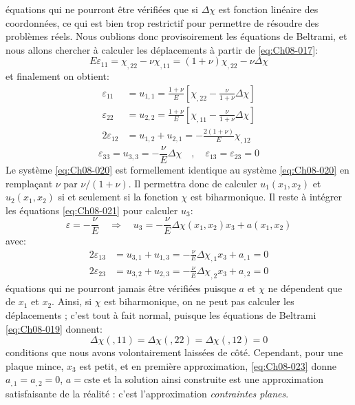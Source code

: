 équations qui ne pourront être vérifiées que si $\Delta\chi$ est fonction linéaire des coordonnées, ce qui est bien trop restrictif pour permettre de résoudre des problèmes réels.
Nous oublions donc provisoirement les équations de Beltrami, et nous allons chercher à calculer les déplacements à partir de \eqref{eq:Ch08-017}: 
\begin{equation*}
  E\varepsilon_{11}=\chi_{,22}-\nu\chi_{,11}=(1+\nu)\chi_{,22}-\nu\Delta\chi
\end{equation*}
et finalement on obtient: 
\begin{equation}
    \begin{aligned}
        \varepsilon_{11}   &  = u_{1,1} = \frac{1+\nu}{E} \left[\chi_{,22}-\frac{\nu}{1+\nu}\Delta\chi\right]\\
        \varepsilon_{22}   &  = u_{2,2} =   \frac{1+\nu}{E} \left[\chi_{,11}-\frac{\nu}{1+\nu}\Delta\chi\right]\\
        2\varepsilon_{12}  &  = u_{1,2} + u_{2,1} =  -\frac{2(1+\nu)}{E} \chi_{,12}
    \end{aligned}
    \label{eq:Ch08-020}
\end{equation}
\begin{equation}
    \varepsilon_{33} = u_{3,3} = -\frac{\nu}{E}\Delta \chi \quad,\quad \varepsilon_{13} = \varepsilon_{23} = 0
    \label{eq:Ch08-021}
\end{equation}
Le système \eqref{eq:Ch08-020} est formellement identique au système \eqref{eq:Ch08-020} en remplaçant $\nu$ par $\nu/(1+\nu)$.
Il permettra donc de calculer $u_1(x_1,x_2)$ et $u_2(x_1,x_2)$ si et seulement si la fonction $\chi$ est biharmonique.
Il reste à intégrer les équations \eqref{eq:Ch08-021} pour calculer $u_3$: 
\begin{equation}
  \varepsilon = - \frac{\nu}{E} \quad \Rightarrow \quad u_3 = - \frac{\nu}{E} \Delta \chi(x_1,x_2)x_3+a(x_1,x_2)
\label{eq:Ch08-022}
\end{equation}
avec:
\begin{equation}
  \begin{aligned}
     2 \varepsilon_{13} & = u_{3,1}+u_{1,3}=-\frac{\nu}{E} \Delta \chi_{,1}x_3+a_{,1} = 0 \\
     2 \varepsilon_{23} & = u_{3,2}+u_{2,3}=-\frac{\nu}{E} \Delta \chi_{,2}x_3+a_{,2} = 0
  \end{aligned}
\label{eq:Ch08-023}
\end{equation}
équations qui ne pourront jamais être vérifiées puisque $a$ et $\chi$ ne dépendent que de $x_1$ et $x_2$. 
Ainsi, si $\chi$ est biharmonique, on ne peut pas calculer les déplacements ; c'est tout à fait normal, puisque les équations de Beltrami \eqref{eq:Ch08-019} donnent: 
\begin{equation}
  \Delta \chi(,11) = \Delta \chi(,22) = \Delta \chi(,12) = 0
\label{eq:Ch08-024}
\end{equation}
conditions que nous avons volontairement laissées de côté.
Cependant, pour une plaque mince, $x_3$ est petit, et en première approximation, \eqref{eq:Ch08-023} donne $a_{,1}=a_{,2}=0$, $a=\text{cste}$ et la solution ainsi construite est une approximation satisfaisante de la réalité : c'est l'approximation \emph{contraintes planes}.
 
